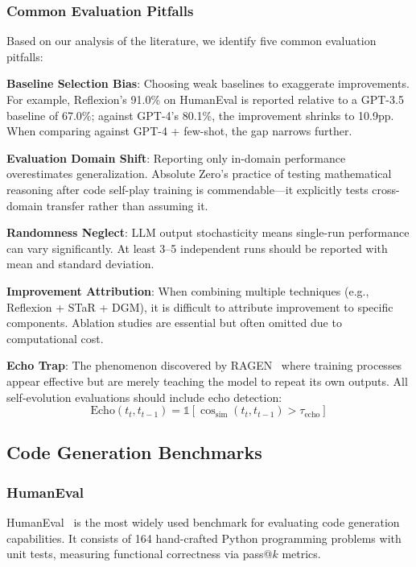 \subsubsection{Common Evaluation Pitfalls}

Based on our analysis of the literature, we identify five common evaluation pitfalls:

\textbf{Baseline Selection Bias}: Choosing weak baselines to exaggerate improvements. For example, Reflexion's 91.0\% on HumanEval is reported relative to a GPT-3.5 baseline of 67.0\%; against GPT-4's 80.1\%, the improvement shrinks to 10.9pp. When comparing against GPT-4 + few-shot, the gap narrows further.

\textbf{Evaluation Domain Shift}: Reporting only in-domain performance overestimates generalization. Absolute Zero's practice of testing mathematical reasoning after code self-play training is commendable---it explicitly tests cross-domain transfer rather than assuming it.

\textbf{Randomness Neglect}: LLM output stochasticity means single-run performance can vary significantly. At least 3--5 independent runs should be reported with mean and standard deviation.

\textbf{Improvement Attribution}: When combining multiple techniques (e.g., Reflexion + STaR + DGM), it is difficult to attribute improvement to specific components. Ablation studies are essential but often omitted due to computational cost.

\textbf{Echo Trap}: The phenomenon discovered by RAGEN~\citep{ragen2025} where training processes appear effective but are merely teaching the model to repeat its own outputs. All self-evolution evaluations should include echo detection:
\begin{equation}
\text{Echo}(t_t, t_{t-1}) = \mathbb{1}\left[\cos_{\mathrm{sim}}(t_t, t_{t-1}) > \tau_{\mathrm{echo}}\right]
\label{eq:echo-detection}
\end{equation}

\subsection{Code Generation Benchmarks}\label{sec:ch5-code}

\subsubsection{HumanEval}

HumanEval~\citep{chen2021humaneval} is the most widely used benchmark for evaluating code generation capabilities. It consists of 164 hand-crafted Python programming problems with unit tests, measuring functional correctness via pass@$k$ metrics.

